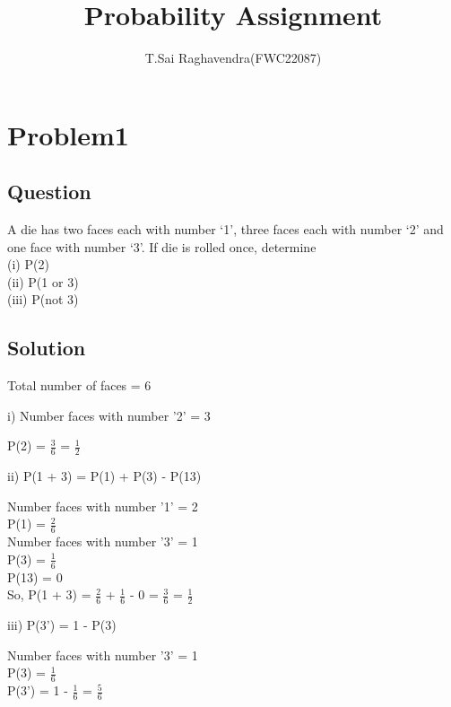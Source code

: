 \documentclass[journal,12pt,twocolumn]{IEEEtran}
\title{\mytitle}
\title{
Probability Assignment
}
\author{T.Sai Raghavendra(FWC22087)}
\begin{document}
\maketitle
\tableofcontents
\bigskip


\section{\textbf{Problem1}}
\subsection{\textbf{Question}}
A die has two faces each with number ‘1’, three faces each with number ‘2’ and
one face with number ‘3’. If die is rolled once, determine\\
(i) P(2) \\(ii) P(1 or 3) \\(iii) P(not 3)\\
\subsection{\textbf{Solution}}
Total number of faces = 6

i) Number faces with number '2' = 3
\begin{center}
	P(2) = $\frac{3}{6}$ = $\frac{1}{2}$
\end{center}
	
ii) P(1 + 3) = P(1) + P(3) - P(13)
\begin{center}
	Number faces with number '1' = 2\\
	P(1) = $\frac{2}{6}$\\
	Number faces with number '3' = 1\\
	P(3) = $\frac{1}{6}$\\
	P(13) = 0\\
	So, P(1 + 3) = $\frac{2}{6}$ + $\frac{1}{6}$ - 0 = $\frac{3}{6}$ = $\frac{1}{2}$
\end{center}
	
iii) P(3') = 1 - P(3)
\begin{center}
	Number faces with number '3' = 1\\
	P(3) = $\frac{1}{6}$\\ 
	P(3') = 1 - $\frac{1}{6}$ = $\frac{5}{6}$
\end{center}
\end{document}
